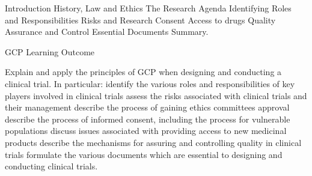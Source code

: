 Introduction
History, Law and Ethics
The Research Agenda
Identifying Roles and Responsibilities
Risks and Research
Consent
Access to drugs
Quality Assurance and Control
Essential Documents
Summary.

GCP Learning Outcome

Explain and apply the principles of GCP when designing and conducting a
clinical trial. In particular:
identify the various roles and responsibilities of key players involved in clinical trials
assess the risks associated with clinical trials and their management
describe the process of gaining ethics committees approval
describe the process of informed consent, including the process for  vulnerable populations
discuss issues associated with providing access to new medicinal products
describe the mechanisms for assuring and controlling quality in clinical trials
formulate the various documents which are essential to designing and conducting clinical trials.

